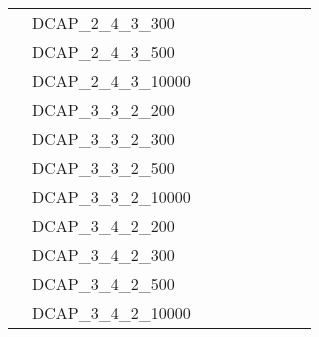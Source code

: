 \begin{table}[H]
{\begin{tabular}{lllllllll}
			& DCAP\_2\_4\_3\_300               &                           &                         &                           &                         &                           &                         &                                 \\
			& DCAP\_2\_4\_3\_500               &                           &                         &                           &                         &                           &                         &                                 \\
			& DCAP\_2\_4\_3\_10000             &                           &                         &                           &                         &                           &                         &                                 \\
			& DCAP\_3\_3\_2\_200               &                           &                         &                           &                         &                           &                         &                                 \\
			& DCAP\_3\_3\_2\_300               &                           &                         &                           &                         &                           &                         &                                 \\
			& DCAP\_3\_3\_2\_500               &                           &                         &                           &                         &                           &                         &                                 \\
			& DCAP\_3\_3\_2\_10000             &                           &                         &                           &                         &                           &                         &                                 \\
			& DCAP\_3\_4\_2\_200               &                           &                         &                           &                         &                           &                         &                                 \\
			& DCAP\_3\_4\_2\_300               &                           &                         &                           &                         &                           &                         &                                 \\
			& DCAP\_3\_4\_2\_500               &                           &                         &                           &                         &                           &                         &                                 \\
			& DCAP\_3\_4\_2\_10000             &                           &                         &                           &                         &                           &                         &                                 \\ \hline
		\end{tabular}%
	}
\end{table}

